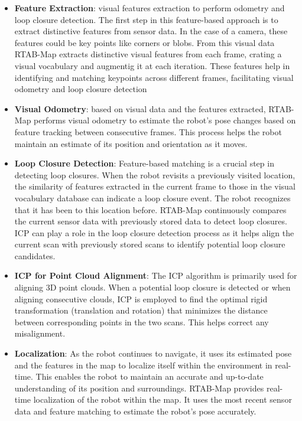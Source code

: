 \begin{itemize}
    \item \textbf{Feature Extraction}: visual features extraction to perform odometry and loop closure detection. The first step in this feature-based approach is to extract distinctive features from sensor data. In the case of a camera, these features could be key points like corners or blobs. From this visual data RTAB-Map extracts distinctive visual features from each frame, crating a visual vocabulary and augmentig it at each iteration. These features help in identifying and matching keypoints across different frames, facilitating visual odometry and loop closure detection
    
    \item \textbf{Visual Odometry}: based on visual data and the features extracted, RTAB-Map performs visual odometry to estimate the robot's pose changes based on feature tracking between consecutive frames. This process helps the robot maintain an estimate of its position and orientation as it moves.
    
    \item \textbf{Loop Closure Detection}: Feature-based matching is a crucial step in detecting loop closures. When the robot revisits a previously visited location, the similarity of features extracted in the current frame to those in the visual vocabulary database can indicate a loop closure event. The robot recognizes that it has been to this location before. RTAB-Map continuously compares the current sensor data with previously stored data to detect loop closures. ICP can play a role in the loop closure detection process as it helps align the current scan with previously stored scans to identify potential loop closure candidates.


    
    \item \textbf{ICP for Point Cloud Alignment}: The ICP algorithm is primarily used for aligning 3D point clouds. When a potential loop closure is detected or when aligning consecutive clouds, ICP is employed to find the optimal rigid transformation (translation and rotation) that minimizes the distance between corresponding points in the two scans. This helps correct any misalignment.
    
    \item \textbf{Localization}: As the robot continues to navigate, it uses its estimated pose and the features in the map to localize itself within the environment in real-time. This enables the robot to maintain an accurate and up-to-date understanding of its position and surroundings. RTAB-Map provides real-time localization of the robot within the map. It uses the most recent sensor data and feature matching to estimate the robot's pose accurately.
    
\end{itemize}

